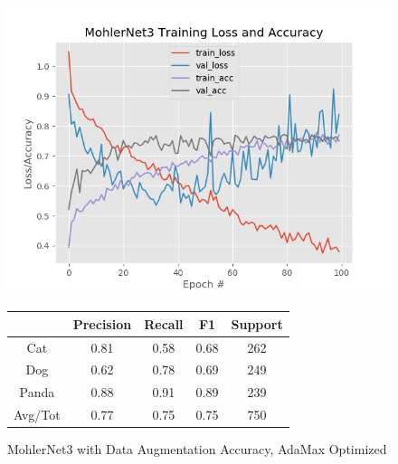 \documentclass[12pt]{article}
\begin{document}
\begin{center}
	 \\
\end{center}


\begin{figure}[h]
	\centering %
	\captionsetup{justification=centering}
	\begin{minipage}{0.5\textwidth}
		\centering %
		\includegraphics[width=1\textwidth]{MohlerNet3_opt-AdamaxAugmented_KEEP.png}
		\caption{MohlerNet3 with Data Augmentation Accuracy, AdaMax Optimized} \label{MN3Aug}
	\end{minipage}\hfill
	\begin{minipage}{0.5\textwidth}
		\begin{center}
			\begin{tabular}[5pt]{| c| c| c| c|c|}
				\hline
				& Precision & Recall & F1 & Support \\[0.5ex] 
				\hline 	
				Cat   &    0.81&      0.58 &     0.68  &     262\\ \hline 
				Dog    &   0.62 &     0.78 &     0.69 &      249    \\ \hline 
				Panda   &   0.88&      0.91  &    0.89  &     239   \\ \hline 
				Avg/Tot  &    0.77 &     0.75   &   0.75   &    750\\ \hline 
				
			\end{tabular}
			\label{MN3RAug}
		\end{center}	
	\end{minipage}
\end{figure}
\end{document}
